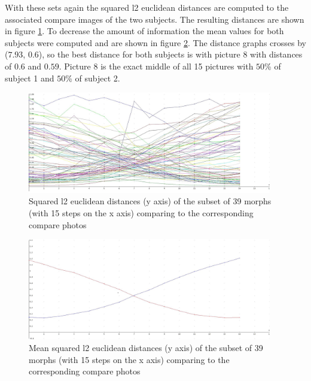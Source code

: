 With these sets again the squared l2 euclidean distances are computed to the associated compare images of the two subjects. The resulting distances are shown in figure \ref{fig:Result39-all}. To decrease the amount of information the mean values for both subjects were computed and are shown in figure \ref{fig:Result39-mean}. The distance graphs crosses by ($7.93$, $0.6$), so the best distance for both subjects is with picture 8 with distances of $0.6$ and $0.59$. Picture 8 is the exact middle of all 15 pictures with $50$\% of subject 1 and $50$\% of subject 2.
\begin{figure}[htbp] 
	\centering
		\includegraphics[width=0.95\textwidth]{Resources/result39-all.jpg}
	\caption{Squared l2 euclidean distances (y axis) of the subset of 39 morphs (with 15 steps on the x axis) comparing to the corresponding compare photos}
	\label{fig:Result39-all}
\end{figure}
\begin{figure}[htbp] 
	\centering
		\includegraphics[width=0.95\textwidth]{Resources/result39-mean.jpg}
	\caption{Mean squared l2 euclidean distances (y axis) of the subset of 39 morphs (with 15 steps on the x axis) comparing to the corresponding compare photos}
	\label{fig:Result39-mean}
\end{figure}

\newpage
